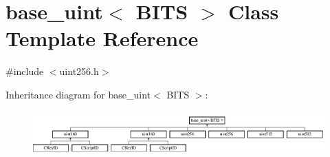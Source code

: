 \hypertarget{classbase__uint}{}\section{base\+\_\+uint$<$ B\+I\+TS $>$ Class Template Reference}
\label{classbase__uint}


{\ttfamily \#include $<$uint256.\+h$>$}

Inheritance diagram for base\+\_\+uint$<$ B\+I\+TS $>$\+:\begin{figure}[H]
\begin{center}
\leavevmode
\includegraphics[height=1.693548cm]{classbase__uint}
\end{center}
\end{figure}

